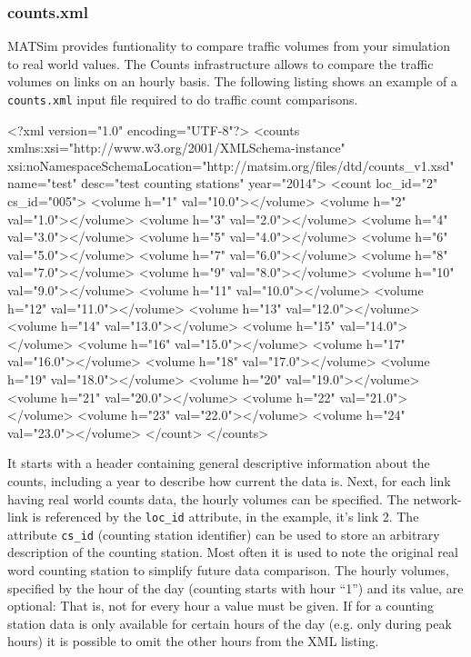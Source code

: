\subsubsection{counts.xml}
MATSim provides funtionality to compare traffic volumes from your simulation to real world values. The Counts infrastructure allows to compare the traffic volumes on links on an hourly basis. The following listing shows an example of a \lstinline|counts.xml| input file required to do traffic count comparisons. 

\begin{xml}
<?xml version="1.0" encoding="UTF-8"?> 
<counts xmlns:xsi="http://www.w3.org/2001/XMLSchema-instance" 
        xsi:noNamespaceSchemaLocation="http://matsim.org/files/dtd/counts_v1.xsd" 
        name="test" desc="test counting stations" year="2014"> 
   <count loc_id="2" cs_id="005"> 
      <volume h="1" val="10.0"></volume> 
      <volume h="2" val="1.0"></volume> 
      <volume h="3" val="2.0"></volume> 
      <volume h="4" val="3.0"></volume> 
      <volume h="5" val="4.0"></volume> 
      <volume h="6" val="5.0"></volume> 
      <volume h="7" val="6.0"></volume> 
      <volume h="8" val="7.0"></volume> 
      <volume h="9" val="8.0"></volume> 
      <volume h="10" val="9.0"></volume> 
      <volume h="11" val="10.0"></volume> 
      <volume h="12" val="11.0"></volume> 
      <volume h="13" val="12.0"></volume> 
      <volume h="14" val="13.0"></volume> 
      <volume h="15" val="14.0"></volume> 
      <volume h="16" val="15.0"></volume> 
      <volume h="17" val="16.0"></volume> 
      <volume h="18" val="17.0"></volume> 
      <volume h="19" val="18.0"></volume> 
      <volume h="20" val="19.0"></volume> 
      <volume h="21" val="20.0"></volume> 
      <volume h="22" val="21.0"></volume> 
      <volume h="23" val="22.0"></volume> 
      <volume h="24" val="23.0"></volume> 
   </count> 
</counts>
\end{xml}

It starts with a header containing general descriptive information about the counts, including a year to describe how current the data is. Next, for each link having real world counts data, the hourly volumes can be specified. The network-link is referenced by the \lstinline|loc_id| attribute, in the example, it's link 2. The attribute \lstinline|cs_id| (counting station identifier) can be used to store an arbitrary description of the counting station. Most often it is used to note the original real word counting station to simplify future data comparison. The hourly volumes, specified by the hour of the day (counting starts with hour ``1'') and its value, are optional: That is, not for every hour a value must be given. If for a counting station data is only available for certain hours of the day (e.g. only during peak hours) it is possible to omit the other hours from the XML listing. 

